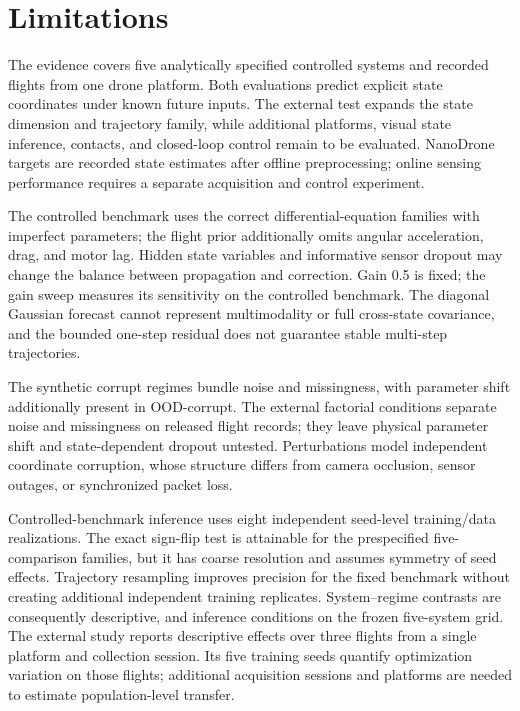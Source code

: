 \section{Limitations}

The evidence covers five analytically specified controlled systems and recorded
flights from one drone platform. Both evaluations predict explicit state
coordinates under known future inputs. The external test expands the state
dimension and trajectory family, while additional platforms, visual state
inference, contacts, and closed-loop control remain to be evaluated. NanoDrone
targets are recorded state estimates after offline preprocessing; online sensing
performance requires a separate acquisition and control experiment.

The controlled benchmark uses the correct differential-equation families with
imperfect parameters; the flight prior additionally omits angular acceleration,
drag, and motor lag. Hidden state variables and informative sensor dropout may
change the balance between propagation and correction. Gain 0.5 is fixed;
the gain sweep measures its sensitivity on the controlled benchmark. The
diagonal Gaussian forecast cannot represent multimodality or full cross-state
covariance, and the bounded one-step residual does not guarantee stable
multi-step trajectories.

The synthetic corrupt regimes bundle noise and missingness, with parameter
shift additionally present in OOD-corrupt. The external factorial conditions
separate noise and missingness on released flight records; they leave physical
parameter shift and state-dependent dropout untested. Perturbations model
independent coordinate corruption, whose structure differs from camera
occlusion, sensor outages, or synchronized packet loss.

Controlled-benchmark inference uses eight independent seed-level training/data
realizations. The exact sign-flip test is attainable for the prespecified
five-comparison families, but it has coarse resolution and assumes symmetry of
seed effects. Trajectory resampling improves precision for the fixed benchmark
without creating additional independent training replicates. System--regime
contrasts are consequently descriptive, and inference conditions on the frozen
five-system grid. The external study reports descriptive effects over three
flights from a single platform and collection session. Its five training seeds
quantify optimization variation on those flights; additional acquisition
sessions and platforms are needed to estimate population-level transfer.
